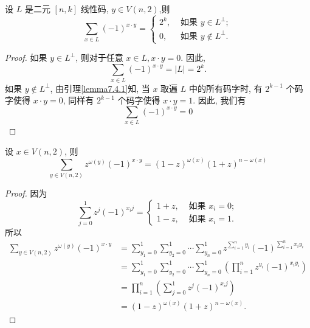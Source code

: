 \begin{lemma}\label{lemma7.4.2}
 设 $ L $ 是二元 $ [n, k] $ 线性码, $ y \in V(n, 2) $,则
$$
\sum_{x \in L}(-1)^{x \cdot y}=\left\{\begin{array}{ll}
2^{k}, & \text { 如果 } y \in L^{\perp} ; \\
0, & \text { 如果 } y \notin L^{\perp} .
\end{array}\right.
$$
\end{lemma}
\begin{proof}
 如果 $ y \in L^{\perp} $, 则对于任意 $ x \in L, x \cdot y=0 $. 因此,
$$
\sum_{x \in L}(-1)^{x \cdot y}=|L|=2^{k} .
$$
如果 $ y \notin L^{\perp} $, 由引理\ref{lemma7.4.1}知, 当 $ x $ 取遍 $ L $ 中的所有码字时, 有 $ 2^{k-1} $ 个码字使得 $ x \cdot y=0 $, 同样有 $ 2^{k-1} $ 个码字使得 $ x \cdot y=1 $. 因此, 我们有
$$
\sum_{x \in L}(-1)^{x \cdot y}=0
$$
\end{proof}

\begin{lemma}\label{lemma7.4.3}
 设 $ x \in V(n, 2) $, 则
$$
\sum_{y \in V(n, 2)} z^{\omega(y)}(-1)^{x \cdot y}=(1-z)^{\omega(x)}(1+z)^{n-\omega(x)}
$$
\end{lemma}
\begin{proof}

 因为
$$
\sum_{j=0}^{1} z^{j}(-1)^{x_{i} j}=\left\{\begin{array}{ll}
1+z, & \text { 如果 } x_{i}=0 ; \\
1-z, & \text { 如果 } x_{i}=1 .
\end{array}\right.
$$
所以
$$ \begin{aligned} \sum_{y \in V(n, 2)} z^{\omega(y)}(-1)^{x \cdot y} & =\sum_{y_{1}=0}^{1} \sum_{y_{2}=0}^{1} \cdots \sum_{y_{n}=0}^{1} z^{\sum_{i=1}^{n} y_{i}}(-1)^{\sum_{i=1}^{n} x_{i} y_{i}} \\ & =\sum_{y_{1}=0}^{1} \sum_{y_{2}=0}^{1} \cdots \sum_{y_{n}=0}^{1}\left(\prod_{i=1}^{n} z^{y_{i}}(-1)^{x_{i} y_{i}}\right) \\ & =\prod_{i=1}^{n}\left(\sum_{j=0}^{1} z^{j}(-1)^{x_{i} j}\right) \\ & =(1-z)^{\omega(x)}(1+z)^{n-\omega(x)} .\end{aligned} $$
\end{proof}

